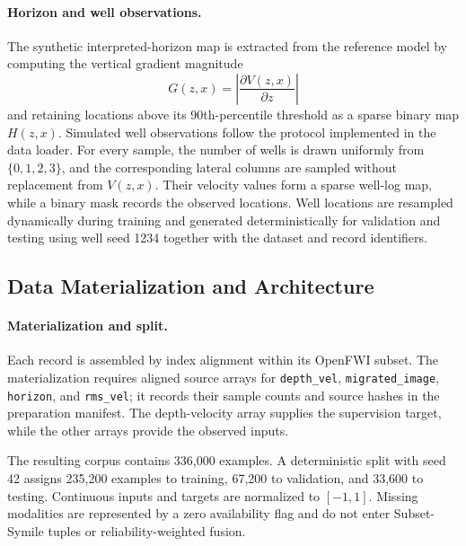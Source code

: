 \paragraph{Horizon and well observations.}
The synthetic interpreted-horizon map is extracted from the reference model by computing the vertical gradient magnitude
\begin{equation}
G(z,x)=\left|\frac{\partial V(z,x)}{\partial z}\right|
\end{equation}
and retaining locations above its 90th-percentile threshold as a sparse binary map $H(z,x)$. Simulated well observations follow the protocol implemented in the data loader. For every sample, the number of wells is drawn uniformly from $\{0,1,2,3\}$, and the corresponding lateral columns are sampled without replacement from $V(z,x)$. Their velocity values form a sparse well-log map, while a binary mask records the observed locations. Well locations are resampled dynamically during training and generated deterministically for validation and testing using well seed 1234 together with the dataset and record identifiers.

\subsection{Data Materialization and Architecture}
\paragraph{Materialization and split.}
Each record is assembled by index alignment within its OpenFWI subset. The materialization requires aligned source arrays for \texttt{depth\_vel}, \texttt{migrated\_image}, \texttt{horizon}, and \texttt{rms\_vel}; it records their sample counts and source hashes in the preparation manifest. The depth-velocity array supplies the supervision target, while the other arrays provide the observed inputs.

The resulting corpus contains 336,000 examples. A deterministic split with seed 42 assigns 235,200 examples to training, 67,200 to validation, and 33,600 to testing. Continuous inputs and targets are normalized to $[-1,1]$. Missing modalities are represented by a zero availability flag and do not enter Subset-Symile tuples or reliability-weighted fusion.

